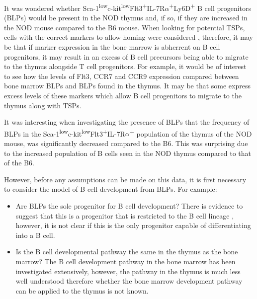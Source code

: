 It was wondered whether Sca-1\textsuperscript{low}c-kit\textsuperscript{low}Flt3\textsuperscript{+}IL-7R$\alpha$\textsuperscript{+}Ly6D\textsuperscript{+} B cell progenitors (BLPs) would be present in the NOD thymus and, if so, if they are increased in the NOD mouse compared to the B6 mouse.
When looking for potential TSPs, cells with the correct markers to allow homing were considered \citep{Zlotoff2011}, therefore, it may be that if marker expression in the bone marrow is abherrent on B cell progenitors, it may result in an excess of B cell precursors being able to migrate to the thymus alongside T cell progenitors.
For example, it would be of interest to see how the levels of Flt3, CCR7 and CCR9 expression compared between bone marrow BLPs and BLPs found in the thymus.
It may be that some express excess levels of these markers which allow B cell progenitors to migrate to the thymus along with TSPs.

It was interesting when investigating the presence of BLPs that the frequency of BLPs in the Sca-1\textsuperscript{low}c-kit\textsuperscript{low}Flt3\textsuperscript{+}IL-7R$\alpha$\textsuperscript{+} population of the thymus of the NOD mouse, was significantly decreased compared to the B6.
This was surprising due to the increased population of B cells seen in the NOD thymus compared to that of the B6.

However, before any assumptions can be made on this data, it is first necessary to consider the model of B cell development from BLPs.
For example:
\begin{itemize}
\item Are BLPs the sole progenitor for B cell development? There is evidence to suggest that this is a progenitor that is restricted to the B cell lineage \citep{Inlay2009}, however, it is not clear if this is the only progenitor capable of differentiating into a B cell.
\item Is the B cell developmental pathway the same in the thymus as the bone marrow? The B cell development pathway in the bone marrow has been investigated extensively, however, the pathway in the thymus is much less well understood therefore whether the bone marrow development pathway can be applied to the thymus is not known. 
\end{itemize}

